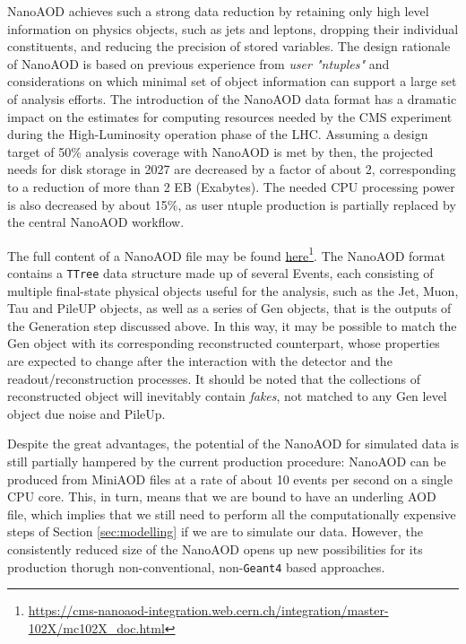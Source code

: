 NanoAOD achieves such a strong data reduction by retaining only high level information on physics objects, such as jets and leptons, dropping their individual constituents, and reducing the precision of stored variables.
The design rationale of NanoAOD is based on previous experience from \emph{user "ntuples"} and considerations on which minimal set of object information can support a large set of analysis efforts. The introduction of the NanoAOD data format has a dramatic impact on the estimates for computing resources needed by the CMS experiment during the High-Luminosity operation phase of the LHC. Assuming a design target of 50$\%$ analysis coverage with NanoAOD is met by then, the projected needs for disk storage in 2027 are decreased by a factor of about 2, corresponding to a reduction of more than 2 EB (Exabytes). The needed CPU processing power is also decreased by about 15$\%$, as user ntuple production is partially replaced by the central NanoAOD workflow. 

The full content of a NanoAOD file may be found \href{https://cms-nanoaod-integration.web.cern.ch/integration/master-102X/mc102X_doc.html}{here}\footnote{\url{https://cms-nanoaod-integration.web.cern.ch/integration/master-102X/mc102X_doc.html}}. The NanoAOD format contains a \texttt{TTree} data structure made up of several Events, each consisting of multiple final-state physical objects useful for the analysis, such as the Jet, Muon, Tau and PileUP objects, as well as a series of Gen objects, that is the outputs of the Generation step discussed above. In this way, it may be possible to match the Gen object with its corresponding reconstructed counterpart, whose properties are expected to change after the interaction with the detector and the readout/reconstruction processes. It should be noted that the collections of reconstructed object will inevitably contain \emph{fakes}, not matched to any Gen level object due noise and PileUp.

Despite the great advantages, the potential of the NanoAOD for simulated data is still partially hampered by the current production procedure: NanoAOD can be produced from MiniAOD files at a rate of about 10 events per second on a
single CPU core. This, in turn, means that we are bound to have an underling AOD file, which implies that we still need to perform all the computationally expensive steps of Section \ref{sec:modelling} if we are to simulate our data.
However, the consistently reduced size of the NanoAOD opens up new possibilities for its production thorugh non-conventional, non-\texttt{Geant4} based approaches. 

